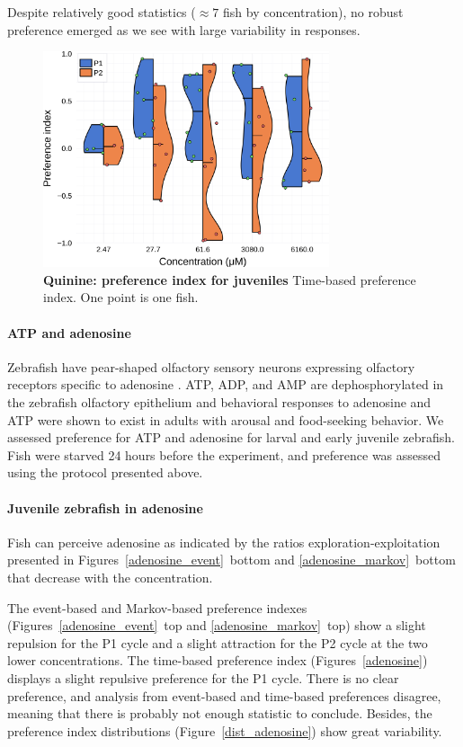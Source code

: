   Despite relatively good statistics ($\approx 7$ fish by concentration), no robust preference emerged as we see with large variability in responses.

    \begin{figure}[h!]
      \centering
      \includegraphics[width=0.75\textwidth]{part_2/assets/dist_quinine.png}
      \caption{\textbf{Quinine: preference index for juveniles} Time-based preference index. One point is one fish. }
      \label{dist_quinine}
    \end{figure}

  \paragraph{ATP and adenosine}
  Zebrafish have pear-shaped olfactory sensory neurons expressing olfactory receptors specific to adenosine \cite{wakisaka2017adenosine}. ATP, ADP, and AMP are dephosphorylated in the zebrafish olfactory epithelium \cite{wakisaka2017adenosine} and behavioral responses to adenosine and ATP were shown to exist in adults with arousal and food-seeking behavior. We assessed preference for ATP and adenosine for larval and early juvenile zebrafish. Fish were starved 24 hours before the experiment, and preference was assessed using the protocol presented above.

  \paragraph{Juvenile zebrafish in adenosine} Fish can perceive adenosine as indicated by the ratios exploration-exploitation presented in Figures~\ref{adenosine_event}~bottom and \ref{adenosine_markov}~bottom that decrease with the concentration.

  The event-based and Markov-based preference indexes (Figures~\ref{adenosine_event}~top and \ref{adenosine_markov}~top) show a slight repulsion for the P1 cycle and a slight attraction for the P2 cycle at the two lower concentrations.  The time-based preference index (Figures~\ref{adenosine}) displays a slight repulsive preference for the P1 cycle. There is no clear preference, and analysis from event-based and time-based preferences disagree, meaning that there is probably not enough statistic to conclude. Besides, the preference index distributions (Figure~\ref{dist_adenosine}) show great variability.


